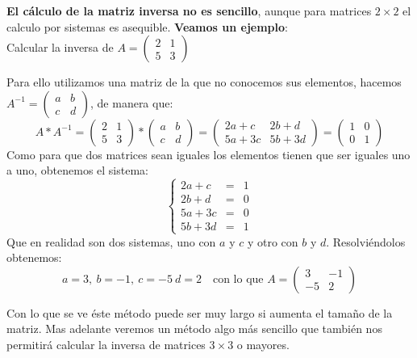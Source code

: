 \documentclass[a4paper,11pt,answers]{exam}
\begin{document}
\textbf{El cálculo de la matriz inversa no es sencillo}, aunque para matrices $2\times 2$ el calculo por sistemas es asequible.
\textbf{Veamos un ejemplo}:\\

Calcular la inversa de $A=\left(\begin{array}{rr}
	2&1\\5&3
\end{array}\right)$\\
\begin{solution}
	Para ello utilizamos una matriz de la que no conocemos sus elementos, hacemos $A^{-1} = \left(\begin{array}{rr}
		a&b\\c&d
	\end{array}\right)$, de manera que:
\[A*A^{-1} = \left(\begin{array}{rr}
	2&1\\5&3
\end{array}\right) * \left(\begin{array}{rr}
a&b\\c&d
\end{array}\right) = \left(\begin{array}{rr}
2a+c&2b+d\\5a+3c&5b+3d
\end{array}\right) = \left(\begin{array}{rr}
1&0\\0&1
\end{array}\right)\]
Como para que dos matrices sean iguales los elementos tienen que ser iguales uno a uno, obtenemos el sistema:
\[\left\lbrace \begin{array}{lll}
	2a+c&=&1\\
	2b+d&=&0\\
	5a+3c&=&0\\
	5b+3d&=&1
\end{array}\right.\]
Que en realidad son dos sistemas, uno con $a$ y $c$ y otro con $b$ y $d$. Resolviéndolos obtenemos:
\[a=3,\ b=-1,\ c=-5\ d=2\quad \text{con lo que }A=\left(\begin{array}{rr}
	3&-1\\-5&2
\end{array}\right)\]
\end{solution}
Con lo que se ve éste método puede ser muy largo si aumenta el tamaño de la matriz.
Mas adelante veremos un método algo más sencillo que también nos permitirá calcular la inversa de matrices $3 \times 3$ o mayores.\\
\end{document}
